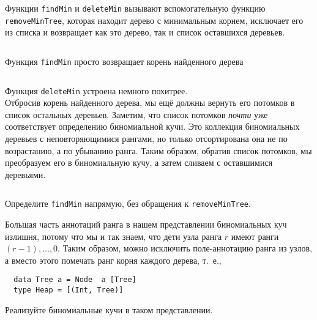 \begin{frame}[fragile]{}
Функции \lstinline!findMin! и \lstinline!deleteMin! вызывают
вспомогательную функцию \lstinline!removeMinTree!, которая находит
дерево с минимальным корнем, исключает его из списка и возвращает как
это дерево, так и список оставшихся деревьев.

\inputminted[firstline=27,lastline=31] {haskell}{code/BinomialHeap.lhs}

Функция \lstinline!findMin! просто возвращает корень найденного дерева

\inputminted[firstline=39,lastline=40,gobble=2] {haskell}{code/BinomialHeap.lhs}

\end{frame}

\begin{frame}[fragile]{}
Функция \lstinline!deleteMin! устроена немного похитрее. \\

 Отбросив
корень найденного дерева, мы ещё должны вернуть его потомков в список
остальных деревьев. Заметим, что список потомков \emph{почти} уже
соответствует определению биномиальной кучи. Это коллекция
биномиальных деревьев с неповторяющимися рангами, но только
отсортирована она не по возрастанию, а по убыванию ранга. Таким
образом, обратив список потомков, мы преобразуем его в биномиальную
кучу, а затем сливаем с оставшимися деревьями.

\inputminted[firstline=42,lastline=43] {haskell}{code/BinomialHeap.lhs}
\end{frame}

\ifanswers
\begin{frame}[fragile]{}
\begin{exercise}\label{ex:3.5}
  Определите \lstinline!findMin! напрямую, без обращения к \lstinline!removeMinTree!.
\end{exercise}

\begin{exercise}\label{ex:3.6}
  Большая часть аннотаций ранга в нашем представлении биномиальных куч
  излишня, потому что мы и так знаем, что дети узла ранга $r$ имеют
  ранги $(r\!-\!1), \ldots, 0$. Таким образом, можно исключить
  поле-аннотацию ранга из узлов, а вместо этого помечать ранг корня
  каждого дерева, т.~е.,
  \begin{verbatim}
  data Tree a = Node  a [Tree]
  type Heap = [(Int, Tree)]
  \end{verbatim}
  Реализуйте биномиальные кучи в таком представлении.
\end{exercise}
\end{frame}

